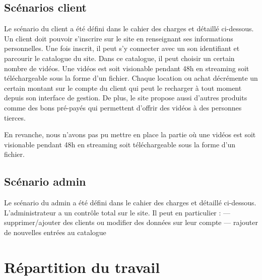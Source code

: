 \documentclass[a4paper,10pt]{report}
\begin{document}
\section{Scénarios client}

Le scénario du client a été défini dans le cahier des charges et détaillé ci-dessous.
Un client doit pouvoir s’inscrire sur le site en renseignant ses informations personnelles. Une fois inscrit, il peut s’y connecter avec un son identifiant et parcourir le catalogue du site. Dans ce catalogue, il peut choisir un certain nombre de vidéos. Une vidéos est soit visionable pendant 48h en streaming soit téléchargeable sous la forme d’un fichier. Chaque location ou achat décrémente un certain montant sur le compte du client qui peut le recharger à tout moment depuis son interface de gestion. De plus, le site propose aussi d’autres produits comme des bons pré-payés qui permettent d’offrir des vidéos à des personnes tierces.

En revanche, nous n'avons pas pu mettre en place la partie où une vidéos est soit visionable pendant 48h en streaming soit téléchargeable sous la forme d’un fichier.

\section{Scénario admin}

Le scénario du admin a été défini dans le cahier des charges et détaillé ci-dessous.
L’administrateur a un contrôle total sur le site. Il peut en particulier :
— supprimer/ajouter des clients ou modifier des données sur leur compte 
— rajouter de nouvelles entrées au catalogue

\chapter{Répartition du travail}

\section{}

\subsection{}

\subsubsection{}
\end{document}
